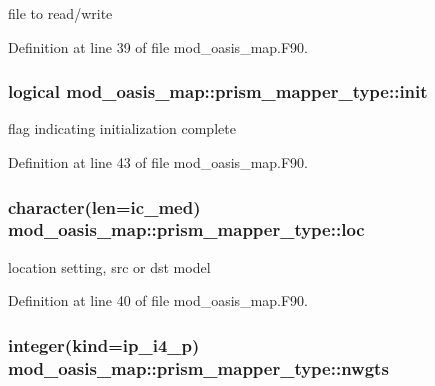 file to read/write 



Definition at line 39 of file mod\+\_\+oasis\+\_\+map.\+F90.

\hypertarget{structmod__oasis__map_1_1prism__mapper__type_aebd50312a6d63fb217231d7cb43cdf65}{
\subsubsection[{init}]{\setlength{\rightskip}{0pt plus 5cm}logical mod\+\_\+oasis\+\_\+map\+::prism\+\_\+mapper\+\_\+type\+::init\hspace{0.3cm}{\ttfamily [private]}}}\label{structmod__oasis__map_1_1prism__mapper__type_aebd50312a6d63fb217231d7cb43cdf65}


flag indicating initialization complete 



Definition at line 43 of file mod\+\_\+oasis\+\_\+map.\+F90.

\hypertarget{structmod__oasis__map_1_1prism__mapper__type_a37a969cc8b9d9234e6e99c6d3ef144ad}{
\subsubsection[{loc}]{\setlength{\rightskip}{0pt plus 5cm}character(len=ic\+\_\+med) mod\+\_\+oasis\+\_\+map\+::prism\+\_\+mapper\+\_\+type\+::loc\hspace{0.3cm}{\ttfamily [private]}}}\label{structmod__oasis__map_1_1prism__mapper__type_a37a969cc8b9d9234e6e99c6d3ef144ad}


location setting, src or dst model 



Definition at line 40 of file mod\+\_\+oasis\+\_\+map.\+F90.

\hypertarget{structmod__oasis__map_1_1prism__mapper__type_a90bcd6831549c027de72dbba1daa0939}{
\subsubsection[{nwgts}]{\setlength{\rightskip}{0pt plus 5cm}integer(kind=ip\+\_\+i4\+\_\+p) mod\+\_\+oasis\+\_\+map\+::prism\+\_\+mapper\+\_\+type\+::nwgts\hspace{0.3cm}{\ttfamily [private]}}}\label{structmod__oasis__map_1_1prism__mapper__type_a90bcd6831549c027de72dbba1daa0939}


